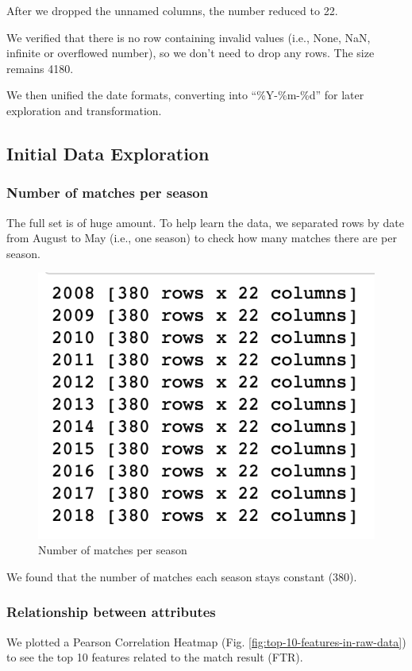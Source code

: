 \documentclass{article}
\begin{document}
After we dropped the unnamed columns, the number reduced to 22.

We verified that there is no row containing invalid values (i.e., None, NaN, infinite or overflowed number), so we don’t need to drop any rows. The size remains 4180.

We then unified the date formats, converting into “\%Y-\%m-\%d” for later exploration and transformation.
\subsection{Initial Data Exploration}
\subsubsection{Number of matches per season}
The full set is of huge amount. To help learn the data, we separated rows by date from August to May (i.e., one season) to check how many matches there are per season.
\begin{figure}[ht]
\centering
\includegraphics[scale=0.4]{graphs/matchesPerSeason.png}
\caption{Number of matches per season}
\label{fig:matchesPerSeason}
\end{figure}

We found that the number of matches each season stays constant (380).

\subsubsection{Relationship between attributes}
We plotted a Pearson Correlation Heatmap (Fig. \ref{fig:top-10-features-in-raw-data}) to see the top 10 features related to the match result (FTR).
\end{document}
